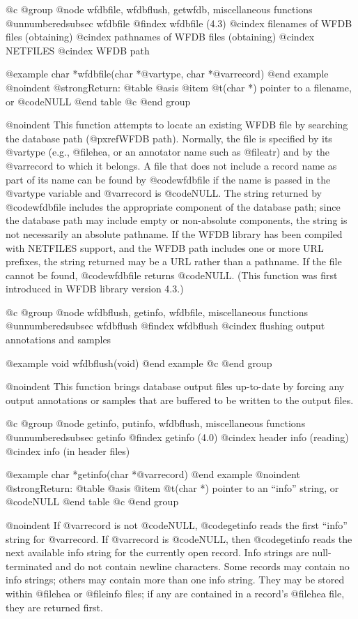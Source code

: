 {{{{{{{{{@c @group
@node     wfdbfile, wfdbflush, getwfdb, miscellaneous functions
@unnumberedsubsec wfdbfile
@findex wfdbfile (4.3)
@cindex filenames of WFDB files (obtaining)
@cindex pathnames of WFDB files (obtaining)
@cindex NETFILES
@cindex WFDB path

@example
char *wfdbfile(char *@var{type}, char *@var{record})
@end example
@noindent
@strong{Return:}
@table @asis
@item @t{(char *)}
pointer to a filename, or @code{NULL}
@end table
@c @end group

@noindent
This function attempts to locate an existing WFDB file by searching the
database path (@pxref{WFDB path}).  Normally, the file is specified by its
@var{type} (e.g., @file{hea}, or an annotator name such as @file{atr})
and by the @var{record} to which it belongs.  A file that does not include a
record name as part of its name can be found by @code{wfdbfile} if the name is
passed in the @var{type} variable and @var{record} is @code{NULL}.  The string
returned by @code{wfdbfile} includes the appropriate component of the database
path; since the database path may include empty or non-absolute components, the
string is not necessarily an absolute pathname.  If the WFDB library has been
compiled with NETFILES support, and the WFDB path includes one or more
URL prefixes, the string returned may be a URL rather than a pathname.  If the
file cannot be found, @code{wfdbfile} returns @code{NULL}.  (This function was
first introduced in WFDB library version 4.3.)

@c @group
@node     wfdbflush, getinfo, wfdbfile, miscellaneous functions
@unnumberedsubsec wfdbflush
@findex wfdbflush
@cindex flushing output annotations and samples

@example
void wfdbflush(void)
@end example
@c @end group

@noindent
This function brings database output files up-to-date by forcing any
output annotations or samples that are buffered to be written to the
output files.

@c @group
@node     getinfo, putinfo, wfdbflush, miscellaneous functions
@unnumberedsubsec getinfo
@findex getinfo (4.0)
@cindex header info (reading) 
@cindex info (in header files)

@example
char *getinfo(char *@var{record})
@end example
@noindent
@strong{Return:}
@table @asis
@item @t{(char *)}
pointer to an ``info'' string, or @code{NULL}
@end table
@c @end group

@noindent
If @var{record} is not @code{NULL}, @code{getinfo} reads the first ``info''
string for @var{record}.  If @var{record} is @code{NULL}, then @code{getinfo}
reads the next available info string for the currently open record.  Info
strings are null-terminated and do not contain newline characters.  Some
records may contain no info strings; others may contain more than one info
string.  They may be stored within @file{hea} or @file{info} files; if any are
contained in a record's @file{hea} file, they are returned first.

}}}}}}}}}
